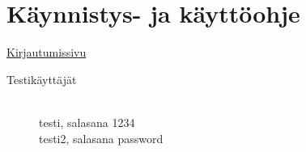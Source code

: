 \documentclass[a4paper, 12pt, finnish]{article}
\begin{document}
\section{Käynnistys- ja käyttöohje}

\href{https://oraisa.users.cs.helsinki.fi/muistilista}{Kirjautumissivu} \\
\begin{description}
  \item[Testikäyttäjät] \hfill \\
  testi, salasana 1234 \\
  testi2, salasana password
\end{description}
\end{document}
